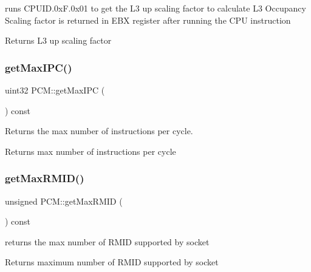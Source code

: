 runs C\+P\+U\+I\+D.\+0x\+F.\+0x01 to get the L3 up scaling factor to calculate L3 Occupancy Scaling factor is returned in E\+BX register after running the C\+PU instruction 

\begin{DoxyReturn}{Returns}
L3 up scaling factor 
\end{DoxyReturn}
\mbox{\label{class_p_c_m_a17084236c1d744a92adec4205415e0ad}} 
\subsubsection{\texorpdfstring{get\+Max\+I\+P\+C()}{getMaxIPC()}}
{\footnotesize\ttfamily uint32 P\+C\+M\+::get\+Max\+I\+PC (\begin{DoxyParamCaption}{ }\end{DoxyParamCaption}) const\hspace{0.3cm}{\ttfamily [inline]}}



Returns the max number of instructions per cycle. 

\begin{DoxyReturn}{Returns}
max number of instructions per cycle 
\end{DoxyReturn}
\mbox{\label{class_p_c_m_a0e1151b2a215849ab67ab2b0056e0e0f}} 
\subsubsection{\texorpdfstring{get\+Max\+R\+M\+I\+D()}{getMaxRMID()}}
{\footnotesize\ttfamily unsigned P\+C\+M\+::get\+Max\+R\+M\+ID (\begin{DoxyParamCaption}{ }\end{DoxyParamCaption}) const}



returns the max number of R\+M\+ID supported by socket 

\begin{DoxyReturn}{Returns}
maximum number of R\+M\+ID supported by socket 
\end{DoxyReturn}
\mbox{\label{class_p_c_m_a83cd795814da47148632b24e485e6075}} 
